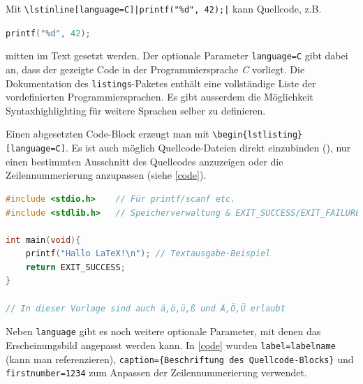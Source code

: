 		Mit \lstinline{\lstinline[language=C]|printf("%d", 42);|} kann Quellcode, z.B. \begin{vorlagenbeispiel}
		\lstinline[language=C]|printf("%d", 42);|
		\end{vorlagenbeispiel} mitten im Text gesetzt werden.
		Der optionale Parameter \lstinline[language=thesis-latexbeispiel]|language=C| gibt dabei an, dass der gezeigte Code in der Programmiersprache \emph{C} vorliegt.
%		
		Die Dokumentation des \lstinline[language=thesis-latexbeispiel]|listings|-Paketes enthält eine vollständige Liste der vordefinierten Programmiersprachen.
		Es gibt ausserdem die Möglichkeit Syntaxhighlighting für weitere Sprachen selber zu definieren.
		\bigskip
		
		Einen abgesetzten Code-Block erzeugt man mit \lstinline[language=thesis-latexbeispiel]|\begin{lstlisting}[language=C]|. Es ist auch möglich Quellcode-Dateien direkt einzubinden (\lstinline[language=thesis-latexbeispiel]||), nur einen bestimmten Ausschnitt des Quellcodes anzuzeigen oder die Zeilennummerierung anzupassen (siehe \autoref{code}).
		
		\begin{vorlagenbeispiel}
			\begin{lstlisting}[label=code, language=C, caption={Hello World-Beispiel im lstlisting-Beispiel},firstnumber=1234, emph={printf, schokostuecke}] 
#include <stdio.h>    // Für printf/scanf etc.
#include <stdlib.h>   // Speicherverwaltung & EXIT_SUCCESS/EXIT_FAILURE-Makros

int main(void){
	printf("Hallo LaTeX!\n"); // Textausgabe-Beispiel
	return EXIT_SUCCESS;
}

// In dieser Vorlage sind auch ä,ö,ü,ß und Ä,Ö,Ü erlaubt
			\end{lstlisting}
		\end{vorlagenbeispiel}
		
		Neben \lstinline|language| gibt es noch weitere optionale Parameter, mit denen das Erscheinungsbild angepasst werden kann.
		In \autoref{code} wurden \lstinline|label=labelname| (kann man referenzieren), \lstinline|caption={Beschriftung des Quellcode-Blocks}| und \lstinline|firstnumber=1234| zum Anpassen der Zeilennummerierung verwendet.
	
